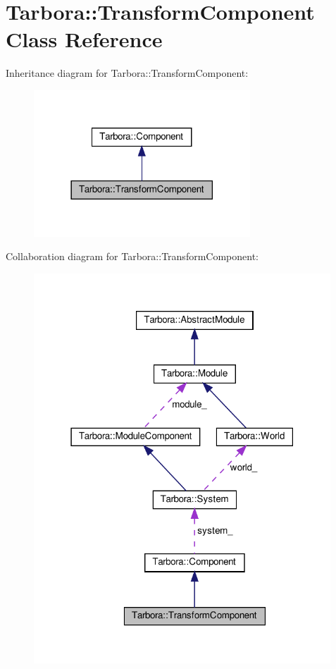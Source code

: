\hypertarget{classTarbora_1_1TransformComponent}{}\section{Tarbora\+:\+:Transform\+Component Class Reference}
\label{classTarbora_1_1TransformComponent}


Inheritance diagram for Tarbora\+:\+:Transform\+Component\+:\nopagebreak
\begin{figure}[H]
\begin{center}
\leavevmode
\includegraphics[width=230pt]{classTarbora_1_1TransformComponent__inherit__graph}
\end{center}
\end{figure}


Collaboration diagram for Tarbora\+:\+:Transform\+Component\+:\nopagebreak
\begin{figure}[H]
\begin{center}
\leavevmode
\includegraphics[width=316pt]{classTarbora_1_1TransformComponent__coll__graph}
\end{center}
\end{figure}
